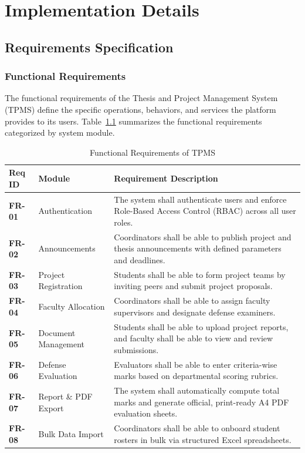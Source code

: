 \chapter{Implementation Details}

\section{Requirements Specification}

\subsection{Functional Requirements}
The functional requirements of the Thesis and Project Management System (TPMS) define the specific operations, behaviors, and services the platform provides to its users. Table~\ref{tab:fr} summarizes the functional requirements categorized by system module.

\begin{table}[H]
\centering
\caption{Functional Requirements of TPMS}
\label{tab:fr}
\vspace{4pt}
\small
\begin{tabularx}{\textwidth}{@{}l p{3.2cm} X@{}}
\toprule
\textbf{Req ID} & \textbf{Module} & \textbf{Requirement Description} \\
\midrule
\textbf{FR-01} & Authentication & The system shall authenticate users and enforce Role-Based Access Control (RBAC) across all user roles. \\

\textbf{FR-02} & Announcements & Coordinators shall be able to publish project and thesis announcements with defined parameters and deadlines. \\

\textbf{FR-03} & Project Registration & Students shall be able to form project teams by inviting peers and submit project proposals. \\

\textbf{FR-04} & Faculty Allocation & Coordinators shall be able to assign faculty supervisors and designate defense examiners. \\

\textbf{FR-05} & Document Management & Students shall be able to upload project reports, and faculty shall be able to view and review submissions. \\

\textbf{FR-06} & Defense Evaluation & Evaluators shall be able to enter criteria-wise marks based on departmental scoring rubrics. \\

\textbf{FR-07} & Report \& PDF Export & The system shall automatically compute total marks and generate official, print-ready A4 PDF evaluation sheets. \\

\textbf{FR-08} & Bulk Data Import & Coordinators shall be able to onboard student rosters in bulk via structured Excel spreadsheets. \\
\bottomrule
\end{tabularx}
\end{table}


